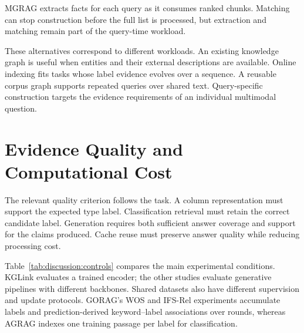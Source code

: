 MGRAG extracts facts for each query as it consumes ranked chunks. Matching can stop construction before the full list is processed, but extraction and matching remain part of the query-time workload.

These alternatives correspond to different workloads. An existing knowledge graph is useful when entities and their external descriptions are available. Online indexing fits tasks whose label evidence evolves over a sequence. A reusable corpus graph supports repeated queries over shared text. Query-specific construction targets the evidence requirements of an individual multimodal question.

\section{Evidence Quality and Computational Cost}
\label{sec:discussion:cost}
The relevant quality criterion follows the task. A column representation must support the expected type label. Classification retrieval must retain the correct candidate label. Generation requires both sufficient answer coverage and support for the claims produced. Cache reuse must preserve answer quality while reducing processing cost.

Table~\ref{tab:discussion:controls} compares the main experimental conditions. KGLink evaluates a trained encoder; the other studies evaluate generative pipelines with different backbones. Shared datasets also have different supervision and update protocols. GORAG's WOS and IFS-Rel experiments accumulate labels and prediction-derived keyword--label associations over rounds, whereas AGRAG indexes one training passage per label for classification.

